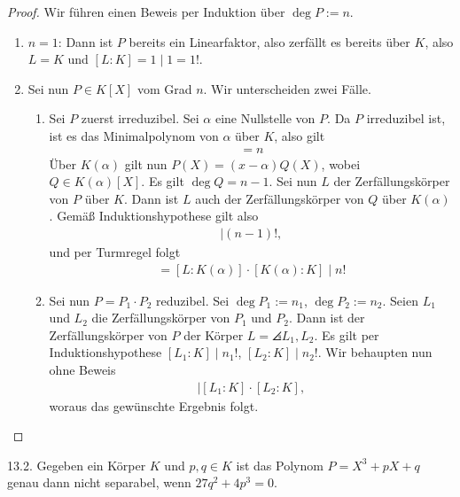 \documentclass{article}
\newcommand{\ex}[1]{\tit{Übung} #1.}
\begin{document}
		\begin{proof}
			Wir führen einen Beweis per Induktion über $\deg P := n$.
			\begin{enumerate}
				\item $n = 1$: Dann ist $P$ bereits ein Linearfaktor, also zerfällt es bereits über $K$, also $L = K$ und $[L:K] = 1 \mid 1 = 1!$.
				\item Sei nun $P \in K[X]$ vom Grad $n$. Wir unterscheiden zwei Fälle.
				\begin{enumerate}
					\item Sei $P$ zuerst irreduzibel. Sei $\alpha$ eine Nullstelle von $P$. Da $P$ irreduzibel ist, ist es das Minimalpolynom von $\alpha$ über $K$, also gilt
					\begin{align*}
						[K(\alpha) : K] = n
					\end{align*}
					Über $K(\alpha)$ gilt nun $P(X) = (x - \alpha)Q(X)$, wobei $Q \in K(\alpha)[X]$. Es gilt $\deg Q = n-1$. Sei nun $L$ der Zerfällungskörper von $P$ über $K$. Dann ist $L$ auch der Zerfällungskörper von $Q$ über $K(\alpha)$. Gemäß Induktionshypothese gilt also
					\begin{align*}
						[L : K(\alpha)] \mid (n-1)!,
					\end{align*}
					und per Turmregel folgt
					\begin{align*}
						[L : K] = [L : K(\alpha)] \cdot [K(\alpha) : K] \mid n!
					\end{align*}
					\item Sei nun $P = P_1 \cdot P_2$ reduzibel. Sei $\deg P_1 := n_1$, $\deg P_2 := n_2$. Seien $L_1$ und $L_2$ die Zerfällungskörper von $P_1$ und $P_2$. Dann ist der Zerfällungskörper von $P$ der Körper $L = \angles{L_1, L_2}$. Es gilt per Induktionshypothese $[L_1 : K] \mid n_1!$, $[L_2 : K] \mid n_2!$. 
					\newpar
					Wir behaupten nun ohne Beweis
					\begin{align*}
						[L : K] \mid [L_1 : K] \cdot [L_2 : K],
					\end{align*}
					woraus das gewünschte Ergebnis folgt.
				\end{enumerate}
			\end{enumerate}
		\end{proof}
		\newpar
		\ex{13.2} Gegeben ein Körper $K$ und $p,q \in K$ ist das Polynom $P = X^3 + pX + q$ genau dann nicht separabel, wenn $27q^2 + 4p^3 = 0$.
\end{document}
